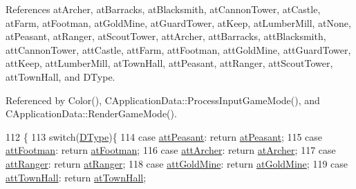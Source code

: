 References at\+Archer, at\+Barracks, at\+Blacksmith, at\+Cannon\+Tower, at\+Castle, at\+Farm, at\+Footman, at\+Gold\+Mine, at\+Guard\+Tower, at\+Keep, at\+Lumber\+Mill, at\+None, at\+Peasant, at\+Ranger, at\+Scout\+Tower, att\+Archer, att\+Barracks, att\+Blacksmith, att\+Cannon\+Tower, att\+Castle, att\+Farm, att\+Footman, att\+Gold\+Mine, att\+Guard\+Tower, att\+Keep, att\+Lumber\+Mill, at\+Town\+Hall, att\+Peasant, att\+Ranger, att\+Scout\+Tower, att\+Town\+Hall, and D\+Type.



Referenced by Color(), C\+Application\+Data\+::\+Process\+Input\+Game\+Mode(), and C\+Application\+Data\+::\+Render\+Game\+Mode().


\begin{DoxyCode}
112                                       \{
113     \textcolor{keywordflow}{switch}(\hyperlink{classCPixelType_aca37f042b510a349e0d3209c73ae51c5}{DType})\{
114         \textcolor{keywordflow}{case} \hyperlink{classCPixelType_af06457fd1c2ff34c67ce670e633a10b0af3b74938163bde519db7dd237b6c961c}{attPeasant}:        \textcolor{keywordflow}{return} \hyperlink{GameDataTypes_8h_a5600d4fc433b83300308921974477fecaf5e570c7e5a2266810f610e7f945ea61}{atPeasant};
115         \textcolor{keywordflow}{case} \hyperlink{classCPixelType_af06457fd1c2ff34c67ce670e633a10b0a9cabf089061719daca16011723f73111}{attFootman}:        \textcolor{keywordflow}{return} \hyperlink{GameDataTypes_8h_a5600d4fc433b83300308921974477fecad586e8ff9ee846d22630c2066e8fb7c2}{atFootman};
116         \textcolor{keywordflow}{case} \hyperlink{classCPixelType_af06457fd1c2ff34c67ce670e633a10b0a8461613b147d9c5e6caf3dc708cd08bf}{attArcher}:         \textcolor{keywordflow}{return} \hyperlink{GameDataTypes_8h_a5600d4fc433b83300308921974477feca7fad0074234068ff0af4092a75b929f8}{atArcher};
117         \textcolor{keywordflow}{case} \hyperlink{classCPixelType_af06457fd1c2ff34c67ce670e633a10b0ac23c50eea82d4a69b44ab664145d273e}{attRanger}:         \textcolor{keywordflow}{return} \hyperlink{GameDataTypes_8h_a5600d4fc433b83300308921974477fecaafd2b1e0ca34872bb06098dbec9939e0}{atRanger};
118         \textcolor{keywordflow}{case} \hyperlink{classCPixelType_af06457fd1c2ff34c67ce670e633a10b0a1d73b839836a167025b789cbbb8edefd}{attGoldMine}:       \textcolor{keywordflow}{return} \hyperlink{GameDataTypes_8h_a5600d4fc433b83300308921974477feca243d9ba44092eadd561db058d742b3b3}{atGoldMine};
119         \textcolor{keywordflow}{case} \hyperlink{classCPixelType_af06457fd1c2ff34c67ce670e633a10b0a85988059946c11ee1a1c6cf3334a54f2}{attTownHall}:       \textcolor{keywordflow}{return} \hyperlink{GameDataTypes_8h_a5600d4fc433b83300308921974477feca5c0fa8a0f367f3358365536d3c7aa321}{atTownHall};

\end{DoxyCode}
